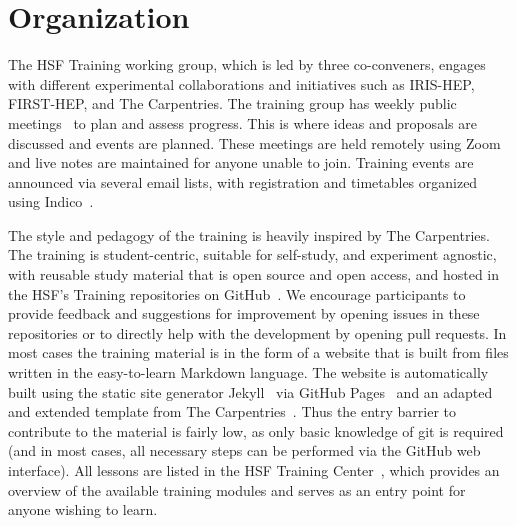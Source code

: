\documentclass[twocolumn]{svjour3}          %
\begin{document}
\section{Organization}\label{sec:Organisation}
%
The HSF Training working group, which is led by three co-conveners, engages with different experimental collaborations and initiatives such as IRIS-HEP, FIRST-HEP, and The Carpentries. The training group has weekly public meetings~\cite{HSF-training-meetings} to plan and assess progress. This is where ideas and proposals are discussed and events are planned. These meetings are held remotely using Zoom and live notes are maintained for anyone unable to join. Training events are announced via several email lists, with registration and timetables organized using  Indico~\cite{HSF-training-events}.

The style and pedagogy of the training is heavily inspired by The Carpentries.
The training is student-centric, suitable for self-study, and experiment agnostic, with reusable study material that is open source and open access, and hosted in the HSF's Training repositories on  GitHub~\cite{HSF-training-materials}. We encourage participants to provide feedback and suggestions for improvement by opening issues in these repositories or to directly help with the development by opening pull requests.
In most cases the training material is in the form of a website that is built from files written in the easy-to-learn Markdown language. The website is automatically built using the static site generator Jekyll~\cite{jekyll} via GitHub Pages~\cite{github-pages} and an adapted and extended template from The Carpentries~\cite{hsf-styles,carpentry-styles}. Thus the entry barrier to contribute to the material is fairly low, as only basic knowledge of git is required (and in most cases, all necessary steps can be performed via the GitHub web interface).
All lessons are listed in the HSF Training Center~\cite{HSF-curriculum}, which provides an overview of the available training modules and serves as an entry point for anyone wishing to learn.
\end{document}
